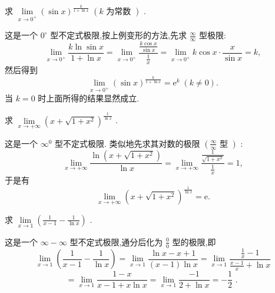 \begin{example}
求 \(\mathop{\lim }\limits_{{x \rightarrow  {0}^{ + }}}{\left( \sin x\right) }^{\frac{k}{1 + \ln x}}\;\left( {k\text{ 为常数 }}\right)\) .
\end{example}


\begin{solution}
这是一个 \({0}^{ \circ  }\) 型不定式极限,按上例变形的方法,先求 \(\frac{\infty }{\infty }\) 型极限:
\[
\mathop{\lim }\limits_{{x \rightarrow  {0}^{ + }}}\frac{k\ln \sin x}{1 + \ln x} = \mathop{\lim }\limits_{{x \rightarrow  {0}^{ + }}}\frac{\frac{k\cos x}{\sin x}}{\frac{1}{x}} = \mathop{\lim }\limits_{{x \rightarrow  {0}^{ + }}}k\cos x \cdot  \frac{x}{\sin x} = k,
\]
然后得到
\[
\mathop{\lim }\limits_{{x \rightarrow  {0}^{ + }}}{\left( \sin x\right) }^{\frac{k}{1 + \ln x}} = {\mathrm{e}}^{k}\;\left( {k \neq  0}\right) .
\]
当 \(k = 0\) 时上面所得的结果显然成立.
\end{solution}


\begin{example}
求 \(\mathop{\lim }\limits_{{x \rightarrow   + \infty }}{\left( x + \sqrt{1 + {x}^{2}}\right) }^{\frac{1}{\ln x}}\) .
\end{example}


\begin{solution}
这是一个 \({\infty }^{0}\) 型不定式极限. 类似地先求其对数的极限 \(\left( {\frac{\infty }{\infty }\text{ 型 }}\right)\) :
\[
\mathop{\lim }\limits_{{x \rightarrow   + \infty }}\frac{\ln \left( {x + \sqrt{1 + {x}^{2}}}\right) }{\ln x} = \mathop{\lim }\limits_{{x \rightarrow   + \infty }}\frac{\frac{1}{\sqrt{1 + {x}^{2}}}}{\frac{1}{x}} = 1,
\]
于是有
\[
\mathop{\lim }\limits_{{x \rightarrow   + \infty }}{\left( x + \sqrt{1 + {x}^{2}}\right) }^{\frac{1}{\ln x}} = \mathrm{e}.
\]
\end{solution}

\begin{example}
求 \(\mathop{\lim }\limits_{{x \rightarrow  1}}\left( {\frac{1}{x - 1} - \frac{1}{\ln x}}\right)\) .
\end{example}


\begin{solution}
这是一个 \(\infty  - \infty\) 型不定式极限,通分后化为 \(\frac{0}{0}\) 型的极限,即
\[
\mathop{\lim }\limits_{{x \rightarrow  1}}\left( {\frac{1}{x - 1} - \frac{1}{\ln x}}\right)  = \mathop{\lim }\limits_{{x \rightarrow  1}}\frac{\ln x - x + 1}{\left( {x - 1}\right) \ln x} = \mathop{\lim }\limits_{{x \rightarrow  1}}\frac{\frac{1}{x} - 1}{\frac{x - 1}{x} + \ln x}
\]
\[
= \mathop{\lim }\limits_{{x \rightarrow  1}}\frac{1 - x}{x - 1 + x\ln x} = \mathop{\lim }\limits_{{x \rightarrow  1}}\frac{-1}{2 + \ln x} =  - \frac{1}{2}\text{ . }
\]
\end{solution}

